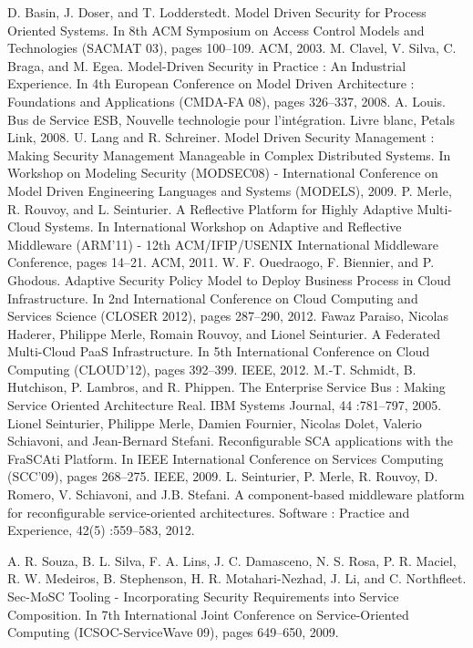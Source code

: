 \documentclass[runningheads,a4paper]{llncs}
\begin{document}
\begin{thebibliography}{4}

 D. Basin, J. Doser, and T. Lodderstedt. Model Driven Security for Process
Oriented Systems. In 8th ACM Symposium on Access Control Models and
Technologies (SACMAT 03), pages 100–109. ACM, 2003.
M. Clavel, V. Silva, C. Braga, and M. Egea. Model-Driven Security in Practice : An Industrial Experience. In 4th European Conference on Model Driven
Architecture : Foundations and Applications (CMDA-FA 08), pages 326–337,
2008.
 A. Louis. Bus de Service ESB, Nouvelle technologie pour l’int\'egration. Livre
blanc, Petals Link, 2008.
 U. Lang and R. Schreiner. Model Driven Security Management : Making
Security Management Manageable in Complex Distributed Systems. In Workshop on Modeling Security (MODSEC08) - International Conference on Model
Driven Engineering Languages and Systems (MODELS), 2009.
 P. Merle, R. Rouvoy, and L. Seinturier. A Reflective Platform for Highly Adaptive Multi-Cloud Systems. In International Workshop
on Adaptive and Reflective Middleware (ARM’11) - 12th ACM/IFIP/USENIX
International Middleware Conference, pages 14–21. ACM, 2011.
 W. F. Ouedraogo, F. Biennier, and P. Ghodous.
Adaptive Security Policy Model to Deploy Business Process in Cloud Infrastructure. In 2nd International Conference on Cloud Computing and Services Science (CLOSER 2012), pages 287–290, 2012.
 Fawaz Paraiso, Nicolas Haderer, Philippe Merle, Romain Rouvoy, and Lionel
Seinturier. A Federated Multi-Cloud PaaS Infrastructure. In 5th International
Conference on Cloud Computing (CLOUD’12), pages 392–399. IEEE, 2012.
 M.-T. Schmidt, B. Hutchison, P. Lambros, and R. Phippen. The Enterprise
Service Bus : Making Service Oriented Architecture Real. IBM Systems Journal, 44 :781–797, 2005.
Lionel Seinturier, Philippe Merle, Damien Fournier, Nicolas Dolet, Valerio
Schiavoni, and Jean-Bernard Stefani. Reconfigurable SCA applications with
the FraSCAti Platform. In IEEE International Conference on Services Computing (SCC’09), pages 268–275. IEEE, 2009.
L. Seinturier, P. Merle, R. Rouvoy, D. Romero, V. Schiavoni, and J.B. Stefani. A component-based middleware platform for reconfigurable service-oriented architectures. Software : Practice and Experience, 42(5) :559–583, 2012.

A. R. Souza, B. L. Silva, F. A. Lins, J. C. Damasceno, N. S. Rosa, P. R. Maciel,
R. W. Medeiros, B. Stephenson, H. R. Motahari-Nezhad, J. Li, and C. Northfleet. Sec-MoSC Tooling - Incorporating Security Requirements into Service Composition. In 7th International Joint Conference on Service-Oriented Computing (ICSOC-ServiceWave 09), pages 649–650, 2009.


\end{thebibliography}
\end{document}
